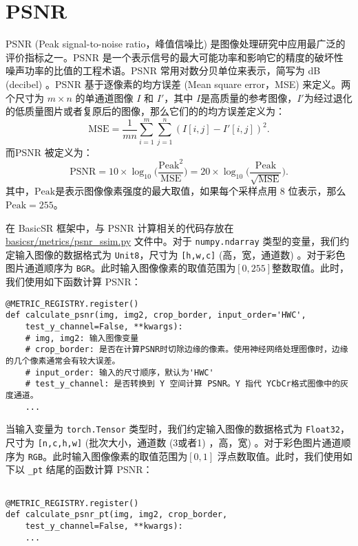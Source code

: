 \documentclass[../main.tex]{subfiles}
\begin{document}
\section{PSNR}

PSNR  (Peak signal-to-noise ratio，峰值信噪比)  是图像处理研究中应用最广泛的评价指标之一。PSNR 是一个表示信号的最大可能功率和影响它的精度的破坏性噪声功率的比值的工程术语。PSNR 常用对数分贝单位来表示，简写为 dB (decibel) 。PSNR 基于逐像素的均方误差 (Mean square error，MSE) 来定义。两个尺寸为 $m\times n$ 的单通道图像 $I$ 和 $I'$，其中 $I$是高质量的参考图像，$I'$为经过退化的低质量图片或者复原后的图像，那么它们的的均方误差定义为：
$$
\mathrm{MSE}=\frac{1}{mn}\sum_{i=1}^{m}\sum_{j=1}^n(I[i,j]-I'[i,j])^2.
$$
而PSNR 被定义为：
$$
\mathrm{PSNR}=10\times \log_{10}\Big(\frac{\mathrm{Peak}^2}{\mathrm{MSE}}\Big)=20\times\log_{10}\Big(\frac{\mathrm{Peak}}{\sqrt{\mathrm{MSE}}}\Big).
$$
其中，$\mathrm{Peak}$是表示图像像素强度的最大取值，如果每个采样点用 8 位表示，那么$\mathrm{Peak}=255$。

在 BasicSR 框架中，与 PSNR 计算相关的代码存放在 \href{https://github.com/XPixelGroup/BasicSR/blob/master/basicsr/metrics/psnr_ssim.py#L12}{basicsr/metrics/psnr\_ssim.py} 文件中。对于 \texttt{numpy.ndarray} 类型的变量，我们约定输入图像的数据格式为 \texttt{Unit8}，尺寸为 \texttt{[h,w,c]} (高，宽，通道数) 。对于彩色图片通道顺序为 \texttt{BGR}。此时输入图像像素的取值范围为$[0,255]$整数取值。此时，我们使用如下函数计算 PSNR：

\begin{verbatim}
@METRIC_REGISTRY.register()
def calculate_psnr(img, img2, crop_border, input_order='HWC',
    test_y_channel=False, **kwargs):
    # img, img2: 输入图像变量
    # crop_border: 是否在计算PSNR时切除边缘的像素。使用神经网络处理图像时，边缘的几个像素通常会有较大误差。
    # input_order: 输入的尺寸顺序，默认为'HWC'
    # test_y_channel: 是否转换到 Y 空间计算 PSNR。Y 指代 YCbCr格式图像中的灰度通道。
    ...
\end{verbatim}

当输入变量为 \texttt{torch.Tensor} 类型时，我们约定输入图像的数据格式为 \texttt{Float32}，尺寸为 \texttt{[n,c,h,w]} (批次大小，通道数 (3或者1) ，高，宽) 。对于彩色图片通道顺序为 \texttt{RGB}。此时输入图像像素的取值范围为$ [0,1]$ 浮点数取值。此时，我们使用如下以 \texttt{\_pt} 结尾的函数计算 PSNR：

\begin{verbatim}

@METRIC_REGISTRY.register()
def calculate_psnr_pt(img, img2, crop_border,
    test_y_channel=False, **kwargs):
    ...
\end{verbatim}
\end{document}
